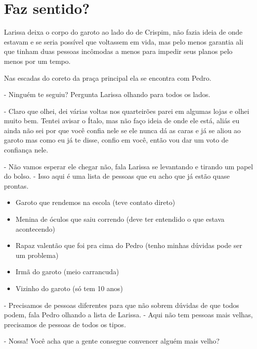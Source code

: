 
\chapter{Faz sentido?}
    



Larissa deixa o corpo do garoto ao lado do de Crispim, não fazia ideia de onde estavam e se seria possível que voltassem em vida, mas pelo menos garantia ali que tinham duas pessoas incômodas a menos para impedir seus planos pelo menos por um tempo.

Nas escadas do coreto da praça principal ela se encontra com Pedro.

- Ninguém te seguiu? Pergunta Larissa olhando para todos os lados.

- Claro que olhei, dei várias voltas nos quarteirões parei em algumas lojas e olhei muito bem.  Tentei avisar o Ítalo, mas não faço ideia de onde ele está, aliás eu ainda não sei por que você confia nele se ele nunca dá as caras e já se aliou ao garoto mas como eu já te disse, confio em você, então vou dar um voto de confiança nele.

- Não vamos esperar ele chegar não, fala Larissa se levantando e tirando um papel do bolso. - Isso aqui é uma lista de pessoas que eu acho que já estão quase prontas.

\begin{itemize}
	\item Garoto que rendemos na escola (teve contato direto)
	\item Menina de óculos que saiu correndo (deve ter entendido o que estava acontecendo)
	\item Rapaz valentão que foi pra cima do Pedro (tenho minhas dúvidas pode ser um problema)
	\item Irmã do garoto (meio carrancuda)
	\item Vizinho do garoto (só tem 10 anos)
\end{itemize}

- Precisamos de pessoas diferentes para que não sobrem dúvidas de que todos podem, fala Pedro olhando a lista de Larissa. - Aqui não tem pessoas mais velhas, precisamos de pessoas de todos os tipos.

- Nossa! Você acha que a gente consegue convencer alguém mais velho?

